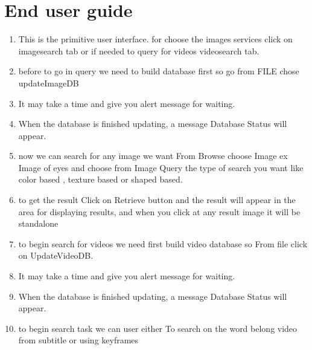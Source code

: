 \documentclass[pdftex,10pt,a4paper,oneside]{article}
\begin{document}
	\section{End user guide}
	\begin{enumerate}
		\item This is the primitive user interface.
		for choose the images services click on imagesearch tab or if needed to query for videos videosearch tab.
		
		
	\pagebreak
	\item before to go in query we need to build database first so go from FILE chose updateImageDB
			
	
		\item 	It may take a time and give you alert message for waiting.

	
	
	\pagebreak
			\item 	When the database is finished updating, a message Database Status will appear.
	
	
	
	
	
	
	
	
	
		\item now we can search for any image we want From Browse choose Image ex Image of eyes and choose from Image Query the type of search you want like color based , texture based or shaped based. 
		
		


\pagebreak
		\item 	to get the result Click on Retrieve button and the result will appear in the area for displaying results, and when you click at any result image it will be  standalone
	


	
	\item to begin search for videos we need first build video database
	so From file click on UpdateVideoDB.
		
		 
	
	
	\pagebreak
		\item 	It may take a time and give you alert message for waiting.
	
	
	
	
	\item 	When the database is finished updating, a message Database Status will appear.
	
\pagebreak
		\item to begin search task we can user either To search on the word belong video from subtitle or using keyframes 
	

\end{enumerate}
\end{document}
